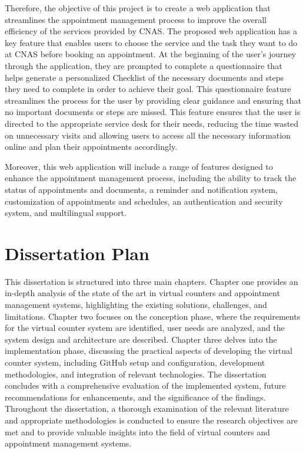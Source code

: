 Therefore, the objective of this project is to create a web application that streamlines the appointment management process to improve the overall efficiency of the services provided by CNAS. The proposed web application has a key feature that enables users to choose the service and the task they want to do at CNAS before booking an appointment. At the beginning of the user's journey through the application, they are prompted to complete a questionnaire that helps generate a personalized Checklist of the necessary documents and steps they need to complete in order to achieve their goal. This questionnaire feature streamlines the process for the user by providing clear guidance and ensuring that no important documents or steps are missed. This feature ensures that the user is directed to the appropriate service desk for their needs, reducing the time wasted on unnecessary visits and allowing users to access all the necessary information online and plan their appointments accordingly.

Moreover, this web application will include a range of features designed to enhance the appointment management process, including the ability to track the status of appointments and documents, a reminder and notification system, customization of appointments and schedules, an authentication and security system, and multilingual support.

\newpage
{}

\section*{Dissertation Plan}

This dissertation is structured into three main chapters. Chapter one provides an in-depth analysis of the state of the art in virtual counters and appointment management systems, highlighting the existing solutions, challenges, and limitations. Chapter two focuses on the conception phase, where the requirements for the virtual counter system are identified, user needs are analyzed, and the system design and architecture are described. Chapter three delves into the implementation phase, discussing the practical aspects of developing the virtual counter system, including GitHub setup and configuration, development methodologies, and integration of relevant technologies. The dissertation concludes with a comprehensive evaluation of the implemented system, future recommendations for enhancements, and the significance of the findings. Throughout the dissertation, a thorough examination of the relevant literature and appropriate methodologies is conducted to ensure the research objectives are met and to provide valuable insights into the field of virtual counters and appointment management systems.

